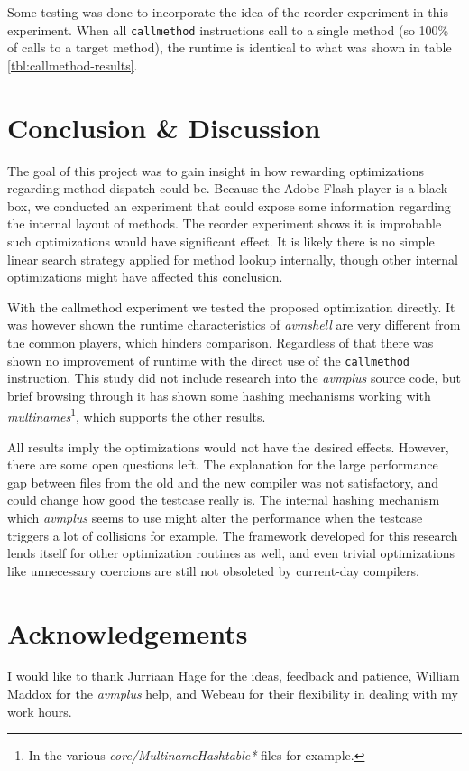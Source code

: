 \documentclass[a4paper,11pt]{scrartcl}
\begin{document}
Some testing was done to incorporate the idea of the reorder experiment in this experiment. When all \texttt{callmethod} instructions call to a single method (so 100\% of calls to a target method), the runtime is identical to what was shown in table \ref{tbl:callmethod-results}.

\newpage

\section{Conclusion \& Discussion}
\label{sec:discussion}

The goal of this project was to gain insight in how rewarding optimizations regarding method dispatch could be. Because the Adobe Flash player is a black box, we conducted an experiment that could expose some information regarding the internal layout of methods. The reorder experiment shows it is improbable such optimizations would have significant effect. It is likely there is no simple linear search strategy applied for method lookup internally, though other internal optimizations might have affected this conclusion.

With the callmethod experiment we tested the proposed optimization directly. It was however shown the runtime characteristics of \textit{avmshell} are very different from the common players, which hinders comparison. Regardless of that there was shown no improvement of runtime with the direct use of the \texttt{callmethod} instruction. This study did not include research into the \textit{avmplus} source code, but brief browsing through it has shown some hashing mechanisms working with \textit{multinames}\footnote{In the various \textit{core/MultinameHashtable*} files for example.}, which supports the other results.

All results imply the optimizations would not have the desired effects. However, there are some open questions left. The explanation for the large performance gap between files from the old and the new compiler was not satisfactory, and could change how good the testcase really is. The internal hashing mechanism which \textit{avmplus} seems to use might alter the performance when the testcase triggers a lot of collisions for example. The framework developed for this research lends itself for other optimization routines as well, and even trivial optimizations like unnecessary coercions are still not obsoleted by current-day compilers.

\section{Acknowledgements}
I would like to thank Jurriaan Hage for the ideas, feedback and patience, William Maddox for the \textit{avmplus} help, and Webeau for their flexibility in dealing with my work hours.
\end{document}
